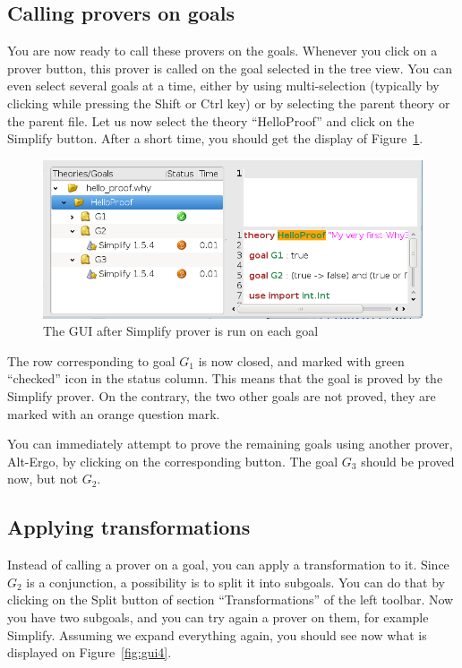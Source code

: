 \subsection{Calling provers on goals}

You are now ready to call these provers on the goals. Whenever you
click on a prover button, this prover is called on the goal selected
in the tree view. You can even select several goals at a time, either
by using multi-selection (typically by clicking while pressing the
\textsf{Shift} or \textsf{Ctrl} key) or by selecting the parent theory
or the parent file. Let us now select the theory ``HelloProof'' and
click on the \textsf{Simplify} button. After a short time, you should
get the display of Figure~\ref{fig:gui3}.

\begin{figure}[tbp]
  \includegraphics[width=\textwidth]{gui3.png}
  \caption{The GUI after Simplify prover is run on each goal}
  \label{fig:gui3}
\end{figure}

The row corresponding to goal $G_1$ is now closed, and marked with
green ``checked'' icon in the status column. This means that the goal
is proved by the Simplify prover. On the contrary, the two other goals
are not proved, they are marked with an orange question mark.

You can immediately attempt to prove the remaining goals using another
prover, {\eg} Alt-Ergo, by clicking on the corresponding button. The
goal $G_3$ should be proved now, but not $G_2$. 

\subsection{Applying transformations}

Instead of calling a prover on a goal, you can apply a transformation
to it.  Since $G_2$ is a conjunction, a possibility is to split it
into subgoals. You can do that by clicking on the \textsf{Split}
button of section ``Transformations'' of the left toolbar. Now you
have two subgoals, and you can try again a prover on them, for example
Simplify. Assuming we expand everything again, you should see now what
is displayed on Figure~\ref{fig:gui4}.


